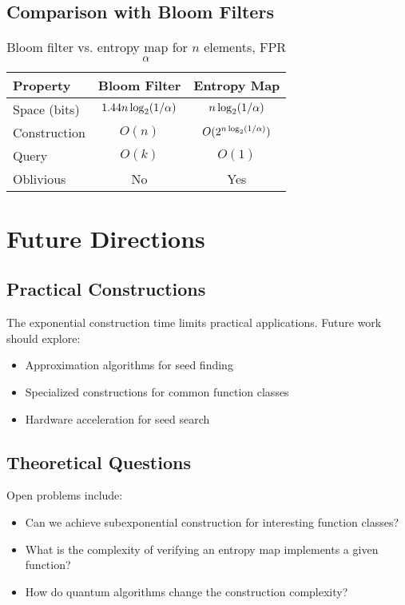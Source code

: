 \documentclass[11pt,final,hidelinks]{article}
\begin{document}
\subsection{Comparison with Bloom Filters}

\begin{table}[h]
\centering
\begin{tabular}{lcc}
\toprule
Property & Bloom Filter & Entropy Map \\
\midrule
Space (bits) & $1.44n\log_2(1/\alpha)$ & $n\log_2(1/\alpha)$ \\
Construction & $O(n)$ & $O(2^{n\log_2(1/\alpha)})$ \\
Query & $O(k)$ & $O(1)$ \\
Oblivious & No & Yes \\
\bottomrule
\end{tabular}
\caption{Bloom filter vs. entropy map for $n$ elements, FPR $\alpha$}
\end{table}

\section{Future Directions}

\subsection{Practical Constructions}

The exponential construction time limits practical applications. Future work should explore:
\begin{itemize}
    \item Approximation algorithms for seed finding
    \item Specialized constructions for common function classes
    \item Hardware acceleration for seed search
\end{itemize}

\subsection{Theoretical Questions}

Open problems include:
\begin{itemize}
    \item Can we achieve subexponential construction for interesting function classes?
    \item What is the complexity of verifying an entropy map implements a given function?
    \item How do quantum algorithms change the construction complexity?
\end{itemize}
\end{document}

